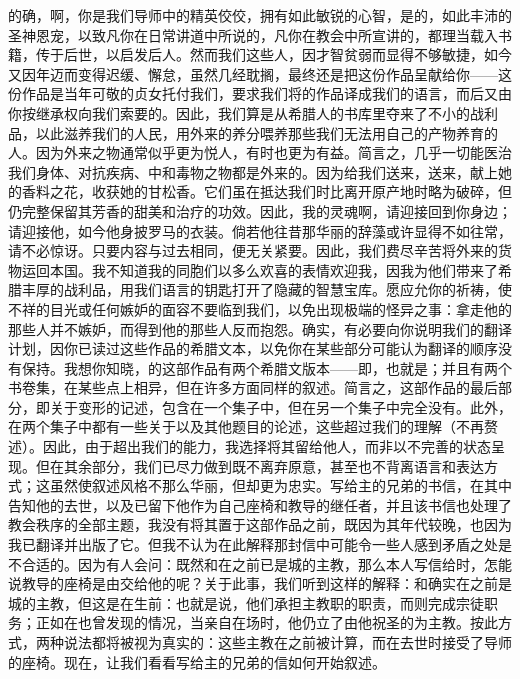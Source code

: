 的确，啊，你是我们导师中的精英佼佼，拥有如此敏锐的心智，是的，如此丰沛的圣神恩宠，以致凡你在日常讲道中所说的，凡你在教会中所宣讲的，都理当载入书籍，传于后世，以启发后人。然而我们这些人，因才智贫弱而显得不够敏捷，如今又因年迈而变得迟缓、懈怠，虽然几经耽搁，最终还是把这份作品呈献给你——这份作品是当年可敬的贞女托付我们，要求我们将的作品译成我们的语言，而后又由你按继承权向我们索要的。因此，我们算是从希腊人的书库里夺来了不小的战利品，以此滋养我们的人民，用外来的养分喂养那些我们无法用自己的产物养育的人。因为外来之物通常似乎更为悦人，有时也更为有益。简言之，几乎一切能医治我们身体、对抗疾病、中和毒物之物都是外来的。因为给我们送来，送来，献上她的香料之花，收获她的甘松香。它们虽在抵达我们时比离开原产地时略为破碎，但仍完整保留其芳香的甜美和治疗的功效。因此，我的灵魂啊，请迎接回到你身边；请迎接他，如今他身披罗马的衣装。倘若他往昔那华丽的辞藻或许显得不如往常，请不必惊讶。只要内容与过去相同，便无关紧要。因此，我们费尽辛苦将外来的货物运回本国。我不知道我的同胞们以多么欢喜的表情欢迎我，因我为他们带来了希腊丰厚的战利品，用我们语言的钥匙打开了隐藏的智慧宝库。愿应允你的祈祷，使不祥的目光或任何嫉妒的面容不要临到我们，以免出现极端的怪异之事：拿走他的那些人并不嫉妒，而得到他的那些人反而抱怨。确实，有必要向你说明我们的翻译计划，因你已读过这些作品的希腊文本，以免你在某些部分可能认为翻译的顺序没有保持。我想你知晓，的这部作品有两个希腊文版本——即，也就是；并且有两个书卷集，在某些点上相异，但在许多方面同样的叙述。简言之，这部作品的最后部分，即关于变形的记述，包含在一个集子中，但在另一个集子中完全没有。此外，在两个集子中都有一些关于以及其他题目的论述，这些超过我们的理解（不再赘述）。因此，由于超出我们的能力，我选择将其留给他人，而非以不完善的状态呈现。但在其余部分，我们已尽力做到既不离弃原意，甚至也不背离语言和表达方式；这虽然使叙述风格不那么华丽，但却更为忠实。写给主的兄弟的书信，在其中告知他的去世，以及已留下他作为自己座椅和教导的继任者，并且该书信也处理了教会秩序的全部主题，我没有将其置于这部作品之前，既因为其年代较晚，也因为我已翻译并出版了它。但我不认为在此解释那封信中可能令一些人感到矛盾之处是不合适的。因为有人会问：既然和在之前已是城的主教，那么本人写信给时，怎能说教导的座椅是由交给他的呢？关于此事，我们听到这样的解释：和确实在之前是城的主教，但这是在生前：也就是说，他们承担主教职的职责，而则完成宗徒职务；正如在也曾发现的情况，当亲自在场时，他仍立了由他祝圣的为主教。按此方式，两种说法都将被视为真实的：这些主教在之前被计算，而在去世时接受了导师的座椅。现在，让我们看看写给主的兄弟的信如何开始叙述。\par

